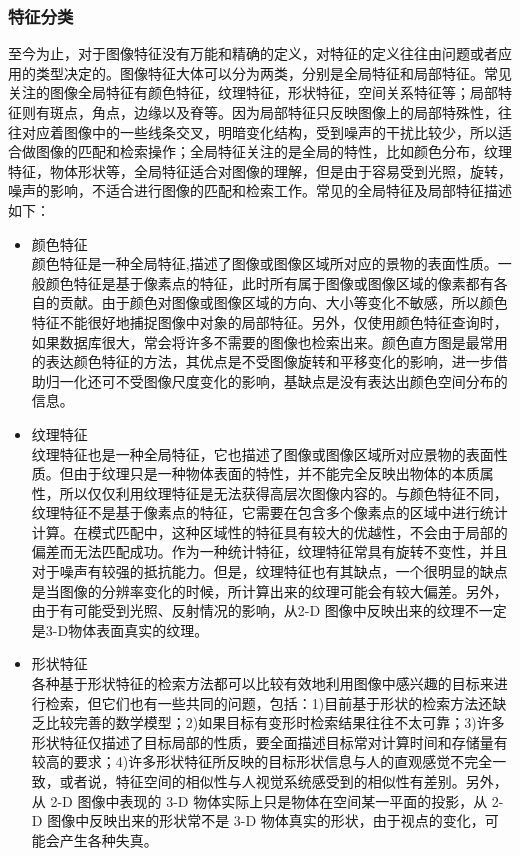 \subsubsection{特征分类}
至今为止，对于图像特征没有万能和精确的定义，对特征的定义往往由问题或者应用的类型决定的。图像特征大体可以分为两类，分别是全局特征和局部特征。常见关注的图像全局特征有颜色特征，纹理特征，形状特征，空间关系特征等；局部特征则有斑点，角点，边缘以及脊等。因为局部特征只反映图像上的局部特殊性，往往对应着图像中的一些线条交叉，明暗变化结构，受到噪声的干扰比较少，所以适合做图像的匹配和检索操作；全局特征关注的是全局的特性，比如颜色分布，纹理特征，物体形状等，全局特征适合对图像的理解，但是由于容易受到光照，旋转，噪声的影响，不适合进行图像的匹配和检索工作。常见的全局特征及局部特征描述如下：
\begin{itemize}
\item 颜色特征\\颜色特征是一种全局特征,描述了图像或图像区域所对应的景物的表面性质。一般颜色特征是基于像素点的特征，此时所有属于图像或图像区域的像素都有各自的贡献。由于颜色对图像或图像区域的方向、大小等变化不敏感，所以颜色特征不能很好地捕捉图像中对象的局部特征。另外，仅使用颜色特征查询时，如果数据库很大，常会将许多不需要的图像也检索出来。颜色直方图是最常用的表达颜色特征的方法，其优点是不受图像旋转和平移变化的影响，进一步借助归一化还可不受图像尺度变化的影响，基缺点是没有表达出颜色空间分布的信息。
\item 纹理特征\\纹理特征也是一种全局特征，它也描述了图像或图像区域所对应景物的表面性质。但由于纹理只是一种物体表面的特性，并不能完全反映出物体的本质属性，所以仅仅利用纹理特征是无法获得高层次图像内容的。与颜色特征不同，纹理特征不是基于像素点的特征，它需要在包含多个像素点的区域中进行统计计算。在模式匹配中，这种区域性的特征具有较大的优越性，不会由于局部的偏差而无法匹配成功。作为一种统计特征，纹理特征常具有旋转不变性，并且对于噪声有较强的抵抗能力。但是，纹理特征也有其缺点，一个很明显的缺点是当图像的分辨率变化的时候，所计算出来的纹理可能会有较大偏差。另外，由于有可能受到光照、反射情况的影响，从2-D 图像中反映出来的纹理不一定是3-D物体表面真实的纹理。
\item 形状特征\\各种基于形状特征的检索方法都可以比较有效地利用图像中感兴趣的目标来进行检索，但它们也有一些共同的问题，包括：1)目前基于形状的检索方法还缺乏比较完善的数学模型；2)如果目标有变形时检索结果往往不太可靠；3)许多形状特征仅描述了目标局部的性质，要全面描述目标常对计算时间和存储量有较高的要求；4)许多形状特征所反映的目标形状信息与人的直观感觉不完全一致，或者说，特征空间的相似性与人视觉系统感受到的相似性有差别。另外，从 2-D 图像中表现的 3-D 物体实际上只是物体在空间某一平面的投影，从 2-D 图像中反映出来的形状常不是 3-D 物体真实的形状，由于视点的变化，可能会产生各种失真。

\end{itemize}
